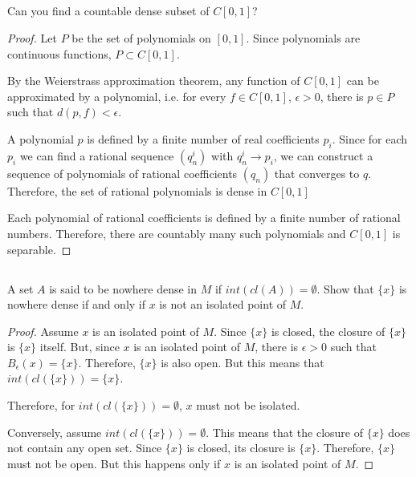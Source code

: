 \subsection{} Can you find a countable dense subset of $C[0,1]$?

\begin{proof}
Let $P$ be the set of polynomials on $[0,1]$. Since polynomials are continuous functions, $P \subset C[0,1]$.

By the Weierstrass approximation theorem, any function of $C[0,1]$ can be approximated by a polynomial, i.e. for every $f \in C[0,1]$, $\epsilon>0$, there is $p \in P$ such that $d(p, f) < \epsilon$.

A polynomial $p$ is defined by a finite number of real coefficients $p_i$. Since for each $p_i$ we can find a rational sequence $(q^i_n)$ with $q^i_n \rightarrow p_i$, we can construct a sequence of polynomials of rational coefficients $(q_n)$ that converges to $q$. Therefore, the set of rational polynomials is dense in $C[0,1]$

Each polynomial of rational coefficients is defined by a finite number of rational numbers. Therefore, there are countably many such polynomials and $C[0,1]$ is separable.
\end{proof}


\subsection{} A set $A$ is said to be nowhere dense in $M$ if $int (cl(A)) = \emptyset$. Show that $\{x\}$  is nowhere dense if and only if $x$ is not an isolated point of $M$. 

\begin{proof}
Assume $x$ is an isolated point of $M$. Since $\{x\}$ is closed, the closure of $\{x\}$ is $\{x\}$ itself. But, since $x$ is an isolated point of $M$, there is $\epsilon>0$ such that $B_\epsilon(x) = \{x\}$. Therefore, $\{x\}$ is also open. But this means that $int(cl(\{x\})) = \{x\}$.

Therefore, for $int(cl(\{x\})) = \emptyset$, $x$ must not be isolated. 

\vspace{1em}

Conversely, assume $int(cl(\{x\})) = \emptyset$.
This means that the closure of $\{x\}$ does not contain any open set. Since $\{x\}$ is closed, its closure is $\{x\}$. Therefore, $\{x\}$ must not be open. But this happens only if $x$ is an isolated point of $M$.

\end{proof}


